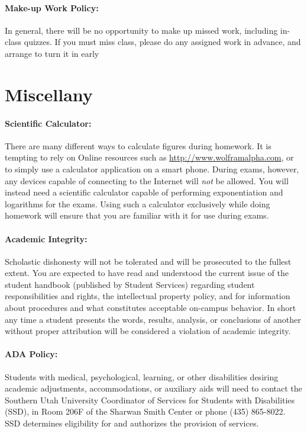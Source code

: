 \documentclass[12pt, letterpaper]{article}
\begin{document}
\paragraph{Make-up Work Policy:}
In general, there will be no opportunity to make up missed work, including in-class quizzes. If you must miss class, please do any assigned work in advance, and arrange to turn it in early

\section*{Miscellany}

\paragraph{Scientific Calculator:}
There are many different ways to calculate figures during homework. It is tempting to rely on Online resources such as \href{http://www.wolframalpha.com}{http://www.wolframalpha.com}, or to simply use a calculator application on a smart phone. During exams, however, any devices capable of connecting to the Internet will \emph{not} be allowed. You will instead need a scientific calculator capable of performing exponentiation and logarithms for the exams. Using such a calculator exclusively while doing homework will ensure that you are familiar with it for use during exams.

\paragraph{Academic Integrity:}
Scholastic dishonesty will not be tolerated and will be prosecuted to the fullest extent. You are expected to have read and understood the current issue of the student handbook (published by Student Services) regarding student responsibilities and rights, the intellectual property policy, and for information about procedures and what constitutes acceptable on-campus behavior. In short any time a student presents the words, results, analysis, or conclusions of another without proper attribution will be considered a violation of academic integrity.

\paragraph{ADA Policy:}
Students with medical, psychological, learning, or other disabilities desiring academic adjustments, accommodations, or auxiliary aids will need to contact the Southern Utah University Coordinator of Services for Students with Disabilities (SSD), in Room 206F of the Sharwan Smith Center or phone (435) 865-8022. SSD determines eligibility for and authorizes the provision of services.
\end{document}
